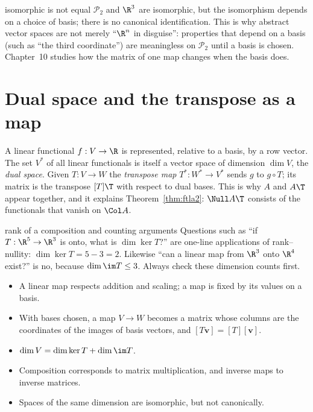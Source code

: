 \begin{nuance}{isomorphic is not equal}
$\mathcal{P}_2$ and $\R^3$ are isomorphic, but the isomorphism depends on a choice of basis; there is no canonical identification. This is why abstract vector spaces are not merely ``$\R^n$ in disguise'': properties that depend on a basis (such as ``the third coordinate'') are meaningless on $\mathcal{P}_2$ until a basis is chosen. Chapter~10 studies how the matrix of one map changes when the basis does.
\end{nuance}

\section{Dual space and the transpose as a map}

A linear functional $f:V\to\R$ is represented, relative to a basis, by a row vector. The set $V^*$ of all linear functionals is itself a vector space of dimension $\dim V$, the \emph{dual space}. Given $T:V\to W$ the \emph{transpose map} $T^*:W^*\to V^*$ sends $g$ to $g\circ T$; its matrix is the transpose $[T]\T$ with respect to dual bases. This is why $A$ and $A\T$ appear together, and it explains Theorem~\ref{thm:ftla2}: $\Null A\T$ consists of the functionals that vanish on $\Col A$.

\begin{interview}{rank of a composition and counting arguments}
Questions such as ``if $T:\R^5\to\R^3$ is onto, what is $\dim\ker T$?'' are one-line applications of rank--nullity: $\dim\ker T=5-3=2$. Likewise ``can a linear map from $\R^3$ onto $\R^4$ exist?'' is no, because $\dim\im T\le3$. Always check these dimension counts first.
\end{interview}

\begin{summarybox}
\begin{itemize}
  \item A linear map respects addition and scaling; a map is fixed by its values on a basis.
  \item With bases chosen, a map $V\to W$ becomes a matrix whose columns are the coordinates of the images of basis vectors, and $[T\mathbf{v}]=[T][\mathbf{v}]$.
  \item $\dim V=\dim\ker T+\dim\im T$.
  \item Composition corresponds to matrix multiplication, and inverse maps to inverse matrices.
  \item Spaces of the same dimension are isomorphic, but not canonically.
\end{itemize}
\end{summarybox}

